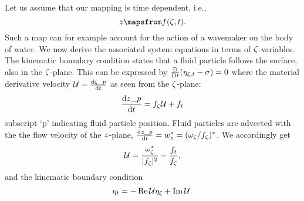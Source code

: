 Let us assume that our mapping is time dependent, i.e.,
\begin{equation}
z \mapsfrom f(\zz,t).
\label{eq:}
\end{equation}
Such a map can for example account for the action of a wavemaker on the body of water.
We now derive the associated system equations in terms of $\zeta$-variables.
The kinematic boundary condition states that a fluid particle follows the surface, also in the $\zeta$-plane.
This can be expressed by $\frac{\mathrm D}{\mathrm Dt}(\eta_{\xi,t}-\sigma)=0$ where
the material derivative velocity $\mathcal U=\frac{\mathrm d \zeta\_p}{\mathrm d t}$ as seen from the $\zeta$-plane:
\[
\frac{\mathrm d z\_p}{\mathrm d t} = f_\zeta \mathcal U + f_t
\]
subscript `p' indicating fluid particle position.
Fluid particles are advected with the the flow velocity of the $z$-plane, $\frac{\mathrm d z\_p}{\mathrm d t}=w_z^*=(\omega_\zeta/f_\zeta)^*$.
We accordingly get
\begin{equation}
\mathcal U = \frac{\omega_\zeta^*}{|f_\zeta|^2}-\frac{f_t}{f_\zeta},
\label{eq:UU}
\end{equation}
and the kinematic boundary condition
\begin{equation}
\eta_t = - \operatorname{Re} \mathcal U \eta_\xi + \operatorname{Im} \mathcal U.
\label{eq:BC_kin_transient}
\end{equation}
%
\\


